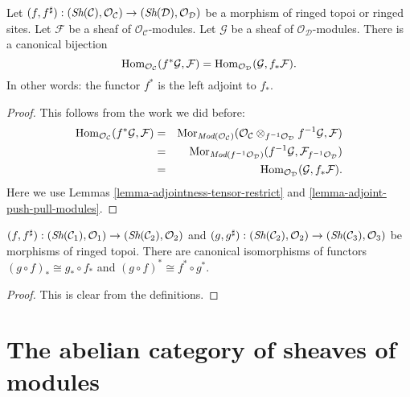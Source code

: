 \begin{lemma}
\label{lemma-adjoint-pullback-pushforward-modules}
Let
$(f, f^\sharp) :
(\mathop{\textit{Sh}}\nolimits(\mathcal{C}), \mathcal{O}_\mathcal{C})
\to
(\mathop{\textit{Sh}}\nolimits(\mathcal{D}), \mathcal{O}_\mathcal{D})$
be a morphism of ringed topoi or ringed sites.
Let $\mathcal{F}$ be a sheaf of $\mathcal{O}_\mathcal{C}$-modules.
Let $\mathcal{G}$ be a sheaf of $\mathcal{O}_\mathcal{D}$-modules.
There is a canonical bijection
$$
\mathop{\rm Hom}\nolimits_{\mathcal{O}_\mathcal{C}}(f^*\mathcal{G}, \mathcal{F})
=
\mathop{\rm Hom}\nolimits_{\mathcal{O}_\mathcal{D}}(\mathcal{G}, f_*\mathcal{F}).
$$
In other words: the functor $f^*$ is the left adjoint to
$f_*$.
\end{lemma}

\begin{proof}
This follows from the work we did before:
\begin{eqnarray*}
\mathop{\rm Hom}\nolimits_{\mathcal{O}_\mathcal{C}}(f^*\mathcal{G}, \mathcal{F})
& = &
\mathop{\rm Mor}\nolimits_{\textit{Mod}(\mathcal{O}_\mathcal{C})}(
\mathcal{O}_\mathcal{C}
\otimes_{f^{-1}\mathcal{O}_\mathcal{D}} f^{-1}\mathcal{G},
\mathcal{F}) \\
& = &
\mathop{\rm Mor}\nolimits_{\textit{Mod}(f^{-1}\mathcal{O}_\mathcal{D})}(
f^{-1}\mathcal{G}, \mathcal{F}_{f^{-1}\mathcal{O}_\mathcal{D}}) \\
& = &
\mathop{\rm Hom}\nolimits_{\mathcal{O}_\mathcal{D}}(\mathcal{G}, f_*\mathcal{F}).
\end{eqnarray*}
Here we use Lemmas \ref{lemma-adjointness-tensor-restrict}
and \ref{lemma-adjoint-push-pull-modules}.
\end{proof}

\begin{lemma}
\label{lemma-push-pull-composition-modules}
$(f, f^\sharp) :
(\mathop{\textit{Sh}}\nolimits(\mathcal{C}_1), \mathcal{O}_1)
\to (\mathop{\textit{Sh}}\nolimits(\mathcal{C}_2), \mathcal{O}_2)$ and
$(g, g^\sharp) :
(\mathop{\textit{Sh}}\nolimits(\mathcal{C}_2), \mathcal{O}_2) \to
(\mathop{\textit{Sh}}\nolimits(\mathcal{C}_3), \mathcal{O}_3)$
be morphisms of ringed topoi.
There are canonical isomorphisms of functors
$(g \circ f)_* \cong g_* \circ f_*$ and
$(g \circ f)^* \cong f^* \circ g^*$.
\end{lemma}

\begin{proof}
This is clear from the definitions.
\end{proof}





\section{The abelian category of sheaves of modules}
\label{section-kernels}

